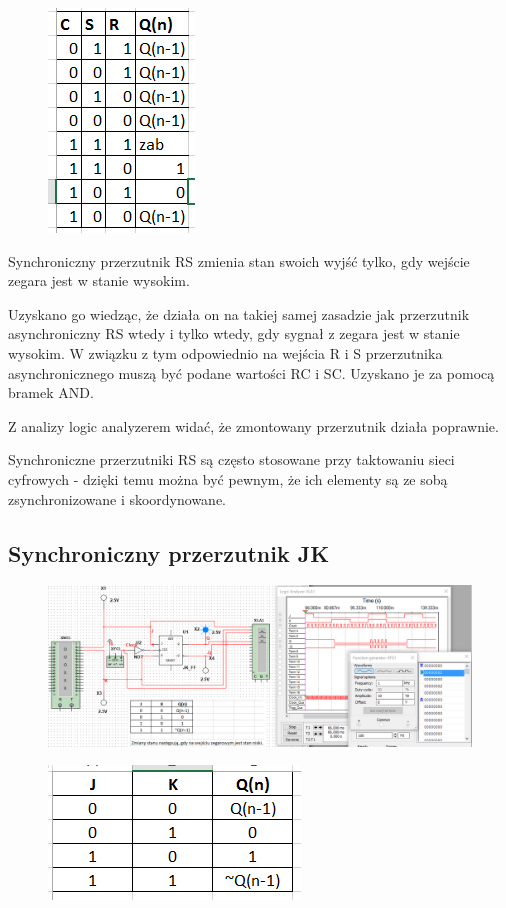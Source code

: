 \documentclass[12pt,a4paper]{article}
\begin{document}
\begin{figure}[H]
\centering
\includegraphics{img/3bTruthTable}
\end{figure}

Synchroniczny przerzutnik RS zmienia stan swoich wyjść tylko, gdy wejście zegara jest w stanie wysokim.

Uzyskano go wiedząc, że działa on na takiej samej zasadzie jak przerzutnik asynchroniczny RS wtedy i tylko wtedy, gdy sygnał z zegara jest w stanie wysokim. W związku z tym odpowiednio na wejścia R i S przerzutnika asynchronicznego muszą być podane wartości RC i SC. Uzyskano je za pomocą bramek AND.


Z analizy logic analyzerem widać, że zmontowany przerzutnik działa poprawnie. 

Synchroniczne przerzutniki RS są często stosowane przy taktowaniu sieci cyfrowych - dzięki temu można być pewnym, że ich elementy są ze sobą zsynchronizowane i skoordynowane.

\subsection{Synchroniczny przerzutnik JK}
\begin{figure}[H]
\centering
\includegraphics[width=\textwidth]{img/3c_syncJK}
\end{figure}

\begin{figure}[H]
\centering
\includegraphics{img/3cTruthTable}
\end{figure}
\end{document}
